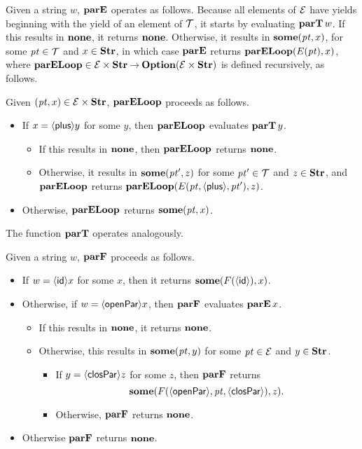 Given a string $w$, $\mathbf{parE}$ operates as follows.  Because all elements
of $\cal E$ have yields beginning with the yield of an element of
$\cal T$, it starts by evaluating $\mathbf{parT}\,w$.  If this results in
$\mathbf{none}$, it returns $\mathbf{none}$.  Otherwise, it results in $\mathbf{some}({\it pt},x)$,
for some ${\it pt}\in{\cal T}$ and $x\in\mathbf{Str}$, in which case $\mathbf{parE}$
returns $\mathbf{parELoop}(E({\it pt}), x)$, where $\mathbf{parELoop}\in{\cal
  E}\times\mathbf{Str}\mathbin{\to}\mathbf{Option}({\cal E}\times\mathbf{Str})$ is defined recursively,
as follows.

Given $({\it pt}, x)\in{\cal E}\times\mathbf{Str}$, $\mathbf{parELoop}$ proceeds as
follows.
\begin{itemize}
\item If $x={{\langle\mathsf{plus}\rangle}}y$ for some $y$, then $\mathbf{parELoop}$ evaluates
  $\mathbf{parT}\,y$.
  \begin{itemize}
  \item If this results in $\mathbf{none}$, then $\mathbf{parELoop}$ returns $\mathbf{none}$.
  
  \item Otherwise, it results in $\mathbf{some}({\it pt}',z)$ for some
    ${\it pt}'\in{\cal T}$ and $z\in\mathbf{Str}$, and $\mathbf{parELoop}$ returns
    $\mathbf{parELoop}(E({\it pt},{\langle\mathsf{plus}\rangle},{\it pt}'),z)$.
  \end{itemize}

\item Otherwise, $\mathbf{parELoop}$ returns $\mathbf{some}({\it pt},x)$.
\end{itemize}
The function $\mathbf{parT}$ operates analogously.

Given a string $w$, $\mathbf{parF}$ proceeds as follows.
\begin{itemize}
\item If $w={\langle\mathsf{id}\rangle} x$ for some $x$, then it returns
  $\mathbf{some}(F({\langle\mathsf{id}\rangle}),x)$.

\item Otherwise, if $w={\langle\mathsf{openPar}\rangle} x$, then $\mathbf{parF}$ evaluates
  $\mathbf{parE}\,x$.
  \begin{itemize}
  \item If this results in $\mathbf{none}$, it returns $\mathbf{none}$.
      
  \item Otherwise, this results in $\mathbf{some}({\it pt},y)$ for some
    ${\it pt}\in{\cal E}$ and $y\in\mathbf{Str}$.
    \begin{itemize}
    \item If $y={\langle\mathsf{closPar}\rangle} z$ for some $z$, then $\mathbf{parF}$ returns
      \begin{displaymath}
       \mathbf{some}(F({\langle\mathsf{openPar}\rangle},{\it pt},{\langle\mathsf{closPar}\rangle}), z) . 
      \end{displaymath}
    
    \item Otherwise, $\mathbf{parF}$ returns $\mathbf{none}$.
    \end{itemize}
  \end{itemize}

  \item Otherwise $\mathbf{parF}$ returns $\mathbf{none}$.
\end{itemize}

